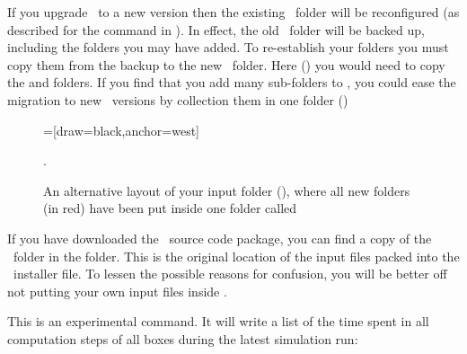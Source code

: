 If you upgrade \US\ to a new version then the existing \ushome\ folder will be reconfigured (as described for the  command in ). In effect, the old \ushome\ folder will be backed up, including the folders you may have added. To re-establish your folders you must copy them from the backup to the new \ushome\ folder. Here () you would need to copy the  and  folders. If you find that you add many sub-folders to , you could ease the migration to new \US\ versions by collection them in one folder ()

\begin {figure} [ht]
\centering
{}=[draw=black,anchor=west]
\caption{An alternative layout of your input folder (), where all new folders (in red) have been put inside one folder called }.
\label{fig:layout-input-folder-2}
\end{figure}

If you have downloaded the \US\ source code package, you can find a copy of the \ folder in the  folder. This is the original location of the input files packed into the \US\ installer file. To lessen the possible reasons for confusion, you will be better off not putting your own input files inside .


This is an experimental command. It will write a list of the time spent in all computation steps of all boxes during the latest simulation run:

